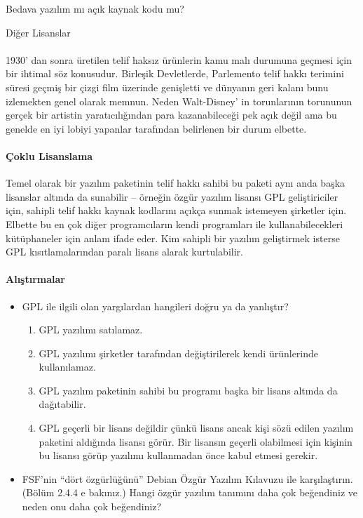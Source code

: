 \documentclass[10pt,a5paper]{book}
\begin{document}
\begin{section}{Bedava yazılım mı açık kaynak kodu mu?}
\begin{subsection}{Diğer Lisanslar}
\paragraph{}{1930' dan sonra üretilen telif haksız ürünlerin kamu malı durumuna geçmesi için bir ihtimal söz konusudur. Birleşik Devletlerde, Parlemento telif hakkı terimini süresi geçmiş bir çizgi film üzerinde genişletti ve dünyanın geri kalanı bunu izlemekten genel olarak memnun. Neden Walt-Disney' in torunlarının torununun gerçek bir artistin yaratıcılığından para kazanabileceği pek açık değil ama bu genelde en iyi lobiyi yapanlar tarafından belirlenen bir durum elbette.}
\paragraph{Çoklu Lisanslama}{Temel olarak bir yazılım paketinin telif hakkı sahibi bu paketi aynı anda başka lisanslar altında da sunabilir – örneğin özgür yazılım lisansı GPL geliştiriciler için, sahipli telif hakkı kaynak kodlarını açıkça sunmak istemeyen şirketler için. Elbette bu en çok diğer programcıların kendi programları ile kullanabilecekleri kütüphaneler için anlam ifade eder. Kim sahipli bir yazılım geliştirmek isterse GPL kısıtlamalarından paralı lisans alarak kurtulabilir.}
\paragraph{Alıştırmalar}{}
\begin{itemize}
 \item GPL ile ilgili olan yargılardan hangileri doğru ya da yanlıştır?
 \begin{enumerate}
 \item GPL yazılımı satılamaz.
 \item GPL yazılımı şirketler tarafından değiştirilerek kendi ürünlerinde kullanılamaz.
 \item GPL yazılım paketinin sahibi bu programı başka bir lisans altında da dağıtabilir.
 \item GPL geçerli bir lisans değildir çünkü lisans ancak kişi sözü edilen yazılım paketini aldığında lisansı görür. Bir lisansın geçerli olabilmesi için kişinin bu lisansı görüp yazılımı kullanmadan önce kabul etmesi gerekir.
 \end{enumerate}
 \item FSF'nin “dört özgürlüğünü” Debian Özgür Yazılım Kılavuzu ile karşılaştırın. (Bölüm 2.4.4 e bakınız.) Hangi özgür yazılım tanımını daha çok beğendiniz ve neden onu daha çok beğendiniz?
\end{itemize}
\end{subsection}
\end{section}
\end{document}
